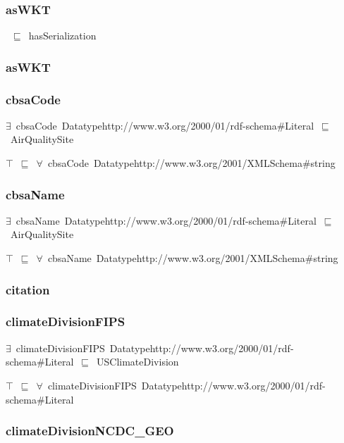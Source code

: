 \documentclass{article}
\begin{document}
\subsubsection*{asWKT}

~\ensuremath{\sqsubseteq}~hasSerialization

\subsubsection*{asWKT}

\subsubsection*{cbsaCode}

\ensuremath{\exists}~cbsaCode~Datatypehttp://www.w3.org/2000/01/rdf-schema#Literal~\ensuremath{\sqsubseteq}~AirQualitySite

\ensuremath{\top}~\ensuremath{\sqsubseteq}~\ensuremath{\forall}~cbsaCode~Datatypehttp://www.w3.org/2001/XMLSchema#string

\subsubsection*{cbsaName}

\ensuremath{\exists}~cbsaName~Datatypehttp://www.w3.org/2000/01/rdf-schema#Literal~\ensuremath{\sqsubseteq}~AirQualitySite

\ensuremath{\top}~\ensuremath{\sqsubseteq}~\ensuremath{\forall}~cbsaName~Datatypehttp://www.w3.org/2001/XMLSchema#string

\subsubsection*{citation}

\subsubsection*{climateDivisionFIPS}

\ensuremath{\exists}~climateDivisionFIPS~Datatypehttp://www.w3.org/2000/01/rdf-schema#Literal~\ensuremath{\sqsubseteq}~USClimateDivision

\ensuremath{\top}~\ensuremath{\sqsubseteq}~\ensuremath{\forall}~climateDivisionFIPS~Datatypehttp://www.w3.org/2000/01/rdf-schema#Literal

\subsubsection*{climateDivisionNCDC\_GEO}
\end{document}
